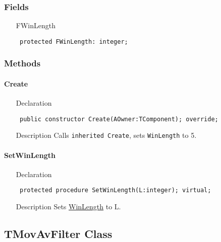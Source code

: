 \documentclass[12pt,a4paper,oneside]{report}
\newcommand{\declarationitem}[1]{{\addfontfeatures{FakeBold=1.3} #1}}
\newcommand{\descriptiontitle}[1]{{\addfontfeatures{FakeSlant}#1}}
\newcommand{\code}[1]{\texttt{#1}}
\begin{document}
\subsubsection{Fields}
\begin{itemize}\label{lmfilters.TFIRFilter-FWinLength}
	\item[\declarationitem{FWinLength}\hfill]
	\begin{flushleft}
		\code{
			protected FWinLength: integer;}
	\end{flushleft}
\end{itemize}
\subsubsection{Methods}
\paragraph{Create}\hspace*{\fill}
\label{lmfilters.TFIRFilter-Create}
\begin{itemize}\item[\declarationitem{Declaration}\hfill]
	\begin{flushleft}
		\code{
			public constructor Create(AOwner:TComponent); override;}
	\end{flushleft}
	\item[\descriptiontitle{Description}] Calls \code{inherited Create}, sets \code{WinLength} to 5.
\end{itemize}
\paragraph{SetWinLength}\hspace*{\fill}
\label{lmfilters.TFIRFilter-SetWinLength}
\begin{itemize}\item[\declarationitem{Declaration}\hfill]
	\begin{flushleft}
		\code{
			protected procedure SetWinLength(L:integer); virtual;}
	\end{flushleft}
\item[\descriptiontitle{Description}] Sets \hyperref[lmfilters.TFIRFilter-WinLength]{WinLength} to L.
\end{itemize}
\subsection{TMovAvFilter Class}
\label{lmfilters.TMovAvFilter}
\end{document}
